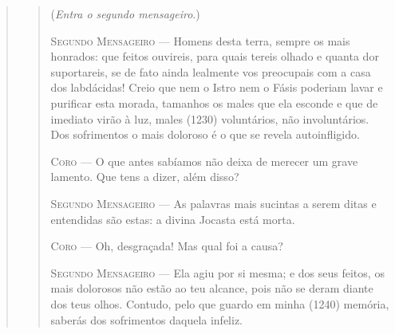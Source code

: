 \begin{verse}
\begin{verse}
(\emph{Entra o segundo mensageiro}.)

\textsc{Segundo Mensageiro} --- Homens desta terra, sempre os mais honrados: que feitos ouvireis, para
quais tereis olhado e quanta dor suportareis, se de fato ainda lealmente
vos preocupais com a casa dos labdácidas! Creio que nem o Istro nem o
Fásis poderiam lavar e purificar esta morada, tamanhos os males que ela
esconde e que de imediato virão à luz, males (1230) voluntários, não
involuntários. Dos sofrimentos o mais doloroso é o que se revela
autoinfligido.

\textsc{Coro} --- O que antes sabíamos não deixa de merecer um grave lamento. Que tens a
dizer, além disso?

\textsc{Segundo Mensageiro} --- As palavras mais sucintas a serem ditas e entendidas são estas: a divina
Jocasta está morta.

\textsc{Coro} --- Oh, desgraçada! Mas qual foi a causa?

\textsc{Segundo Mensageiro} --- Ela agiu por si mesma; e dos seus feitos, os mais dolorosos não estão ao
teu alcance, pois não se deram diante dos teus olhos. Contudo, pelo que
guardo em minha (1240) memória, saberás dos sofrimentos daquela infeliz.


\end{verse}
\end{verse}
